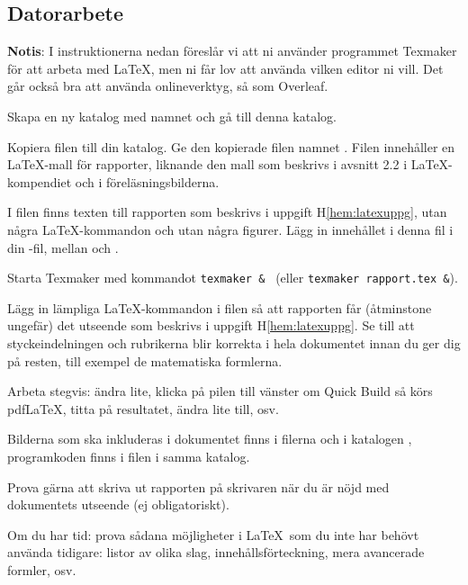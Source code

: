 \subsection*{Datorarbete}

\textbf{Notis}: I instruktionerna nedan föreslår vi att ni använder programmet Texmaker för att arbeta med \LaTeX, men ni får lov att använda vilken editor ni vill. Det går också bra att använda onlineverktyg, så som Overleaf.

\begin{Datorarbete}
	\item Skapa en ny katalog med namnet  och gå till denna katalog.
	\item Kopiera filen  till din katalog. Ge den kopierade filen namnet . Filen innehåller en \LaTeX-mall för rapporter, liknande den mall som beskrivs i avsnitt 2.2 i \LaTeX-kompendiet och i föreläsningsbilderna.

	\item I filen  finns texten till rapporten som beskrivs i uppgift H\ref{hem:latexuppg}, utan några \LaTeX-kommandon och utan några figurer. Lägg in innehållet i denna fil i din -fil, mellan \verb!! och \verb!!.

	\item Starta Texmaker med kommandot \verb/texmaker & / (eller \verb/texmaker rapport.tex &/).

	\item Lägg in lämpliga \LaTeX-kommandon i filen så att rapporten får (åtminstone ungefär) det utseende som beskrivs i uppgift H\ref{hem:latexuppg}. Se till att styckeindelningen och rubrikerna blir korrekta i hela dokumentet innan du ger dig på resten, till exempel de matematiska formlerna.

	Arbeta stegvis: ändra lite, klicka på pilen till vänster om Quick Build så körs pdfLaTeX, titta på resultatet, ändra lite till, osv.

	Bilderna som ska inkluderas i dokumentet finns i filerna  och  i katalogen , programkoden finns i filen  i samma katalog.

	\item Prova gärna att skriva ut rapporten på skrivaren när du är nöjd med dokumentets utseende (ej obligatoriskt).

	\item Om du har tid: prova sådana möjligheter i \LaTeX\ som du inte har behövt använda tidigare: listor av olika slag, innehållsförteckning, mera avancerade formler, osv.
\end{Datorarbete}

